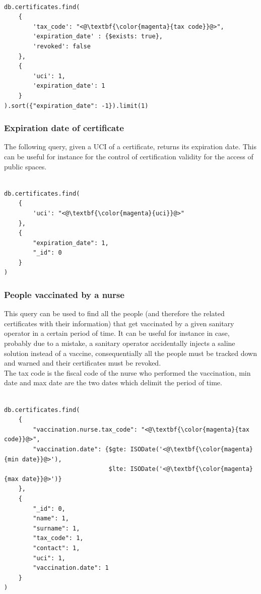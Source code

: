 \documentclass{article}
\begin{document}
\begin{lstlisting}[language=cypher, label=lst:cypher-example]

db.certificates.find(
    {
        'tax_code': "<@\textbf{\color{magenta}{tax code}}@>",
        'expiration_date' : {$exists: true},
        'revoked': false
    },
    {
        'uci': 1,
        'expiration_date': 1
    }
).sort({"expiration_date": -1}).limit(1)

\end{lstlisting}
\newpage
\subsubsection{Expiration date of certificate}
The following query, given a UCI of a certificate, returns its expiration date. This can be useful for instance for the control of certification validity for the access of public spaces.

\begin{lstlisting}[language=cypher, label=lst:cypher-example]

db.certificates.find(
    {
        'uci': "<@\textbf{\color{magenta}{uci}}@>"
    },
    {
        "expiration_date": 1,
        "_id": 0
    }
)

\end{lstlisting}
\subsubsection{People vaccinated by a nurse}
\label{subsec:nurse-query}
This query can be used to find all the people (and therefore the related certificates with their information) that get vaccinated by a given sanitary operator in a certain period of time. It can be useful for instance in case, probably due to a mistake, a sanitary operator accidentally injects a saline solution instead of a vaccine, consequentially all the people must be tracked down and warned and their certificates must be revoked.\\
The tax code is the fiscal code of the nurse who performed the vaccination, min date and max date are the two dates which delimit the period of time.

\begin{lstlisting}[language=cypher, label=lst:cypher-example]

db.certificates.find(
    {
        "vaccination.nurse.tax_code": "<@\textbf{\color{magenta}{tax code}}@>",
        "vaccination.date": {$gte: ISODate('<@\textbf{\color{magenta}{min date}}@>'),
                             $lte: ISODate('<@\textbf{\color{magenta}{max date}}@>')}
    },
    {
        "_id": 0,
        "name": 1,
        "surname": 1,
        "tax_code": 1,
        "contact": 1,
        "uci": 1,
        "vaccination.date": 1
    }
)

\end{lstlisting}
\newpage
\end{document}
